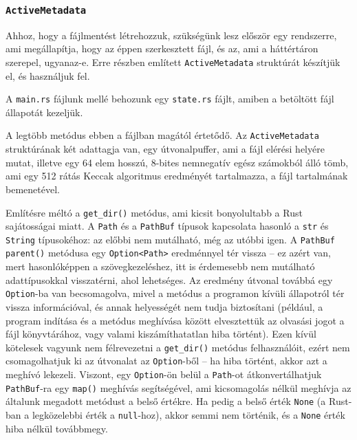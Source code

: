 
\subsubsection{\texttt{ActiveMetadata}}

Ahhoz, hogy a fájlmentést létrehozzuk, szükségünk lesz először egy rendszerre, ami megállapítja,
hogy az éppen szerkesztett fájl, és az, ami a háttértáron szerepel, ugyanaz-e.
Erre  részben említett \texttt{ActiveMetadata} struktúrát készítjük el,
és használjuk fel.

A \texttt{main.rs} fájlunk mellé behozunk egy \texttt{state.rs} fájlt, amiben a betöltött
fájl állapotát kezeljük.



A legtöbb metódus ebben a fájlban magától értetődő.
Az \texttt{ActiveMetadata} struktúrának két adattagja van, egy útvonalpuffer,
ami a fájl elérési helyére mutat, illetve egy 64 elem hosszú, 8-bites nemnegatív egész számokból álló tömb,
ami egy 512 rátás Keccak algoritmus eredményét tartalmazza, a fájl tartalmának bemenetével.

Említésre méltó a \verb+get_dir()+ metódus, ami kicsit bonyolultabb a Rust sajátosságai miatt.
A \texttt{Path} és a \texttt{PathBuf} típusok kapcsolata hasonló a \texttt{str} és \texttt{String}
típusokéhoz: az előbbi nem mutálható, még az utóbbi igen.
A \texttt{PathBuf} \texttt{parent()} metódusa egy \texttt{Option<Path>} eredménnyel tér vissza --
ez azért van, mert hasonlóképpen a szövegkezeléshez, itt is érdemesebb nem mutálható adattípusokkal
visszatérni, ahol lehetséges.
Az eredmény útvonal továbbá egy \texttt{Option}-ba van becsomagolva, mivel a metódus a programon
kívüli állapotról tér vissza információval, és annak helyességét nem tudja biztosítani
(például, a program indítása és a metódus meghívása között elvesztettük az olvasási jogot a fájl
könyvtárához, vagy valami kiszámíthatatlan hiba történt).
Ezen kívül kötelesek vagyunk nem félrevezetni a \verb+get_dir()+ metódus felhasználóit,
ezért nem csomagolhatjuk ki az útvonalat az \texttt{Option}-ből --
ha hiba történt, akkor azt a meghívó lekezeli.
Viszont, egy \texttt{Option}-ön belül a \texttt{Path}-ot átkonvertálhatjuk \texttt{PathBuf}-ra 
egy \texttt{map()} meghívás segítségével, ami kicsomagolás nélkül meghívja az általunk megadott
metódust a belső értékre.
Ha pedig a belső érték \texttt{None} (a Rust-ban a legközelebbi érték a \texttt{null}-hoz),
akkor semmi nem történik, és a \texttt{None} érték hiba nélkül továbbmegy.

